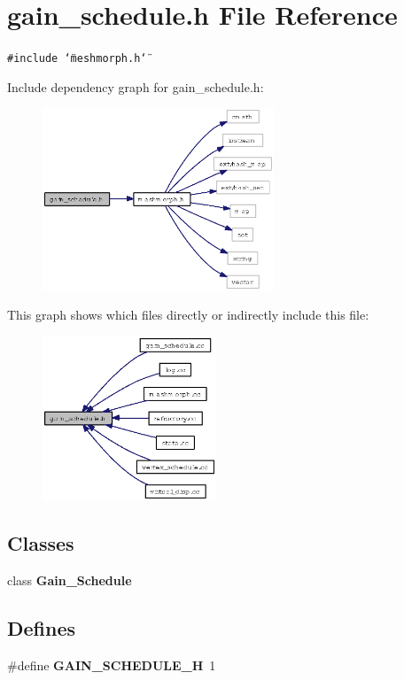 \section{gain\_\-schedule.h File Reference}
\label{gain__schedule_8h}
{\tt \#include \char`\"{}meshmorph.h\char`\"{}}\par


Include dependency graph for gain\_\-schedule.h:\begin{figure}[H]
\begin{center}
\leavevmode
\includegraphics[width=196pt]{gain__schedule_8h__incl}
\end{center}
\end{figure}


This graph shows which files directly or indirectly include this file:\begin{figure}[H]
\begin{center}
\leavevmode
\includegraphics[width=147pt]{gain__schedule_8h__dep__incl}
\end{center}
\end{figure}
\subsection*{Classes}
\begin{CompactItemize}
\item 
class {\bf Gain\_\-Schedule}
\end{CompactItemize}
\subsection*{Defines}
\begin{CompactItemize}
\item 
\#define {\bf GAIN\_\-SCHEDULE\_\-H}~1
\end{CompactItemize}


